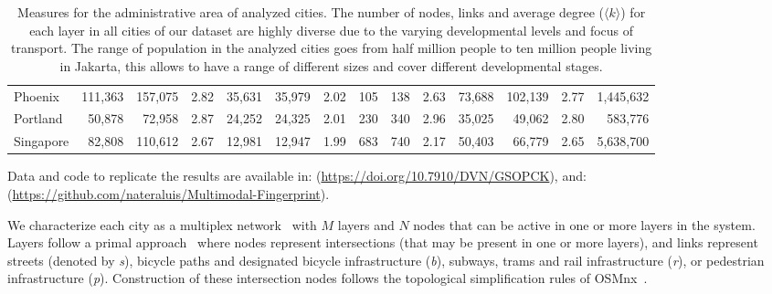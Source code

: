 \begin{table}[ht!]
\begin{adjustbox}{width=\textwidth,keepaspectratio}
\begin{tabular}{l|rrr|rrr|rrr|rrr|r}
			Phoenix    & 111,363                         & 157,075                      & 2.82                      & 35,631                      & 35,979     & 2.02                & 105   & 138   & 2.63                & 73,688  & 102,139 & 2.77                  & 1,445,632  \\
			Portland   & 50,878                          & 72,958                       & 2.87                      & 24,252                      & 24,325     & 2.01                & 230   & 340   & 2.96                & 35,025  & 49,062  & 2.80                  & 583,776    \\
			Singapore  & 82,808                          & 110,612                      & 2.67                      & 12,981                      & 12,947     & 1.99                & 683   & 740   & 2.17                & 50,403  & 66,779  & 2.65                  & 5,638,700
		\end{tabular}
	\end{adjustbox}
	\caption{Measures for the administrative area of analyzed cities. The number of nodes, links and average degree ($\langle k \rangle$) for each layer in all cities of our dataset are highly diverse due to the varying developmental levels and focus of transport. The range of population in the analyzed cities goes from half million people to ten million people living in Jakarta, this allows to
		have a range of different sizes and cover different developmental stages.
		\label{tab:Table1}}
\end{table}

Data and code to replicate the results are available in: (\url{https://doi.org/10.7910/DVN/GSOPCK}), and: (\url{https://github.com/nateraluis/Multimodal-Fingerprint}).

We characterize each city as a multiplex network~\cite{Boccaletti2014Structure,Kivela2014Multilayer,Battiston2017Challenges} with $M$ layers and $N$ nodes that can be active in one or more layers in the system. Layers follow a primal approach~\cite{Porta2006Primal} where nodes represent intersections (that may be present in one or more layers), and links represent streets (denoted by \textit{s}), bicycle paths and designated bicycle infrastructure (\textit{b}), subways, trams and rail infrastructure (\textit{r}), or pedestrian infrastructure (\textit{p}). Construction of these intersection nodes follows the topological simplification rules of OSMnx~\cite{Boeing2017OSMNX}.


